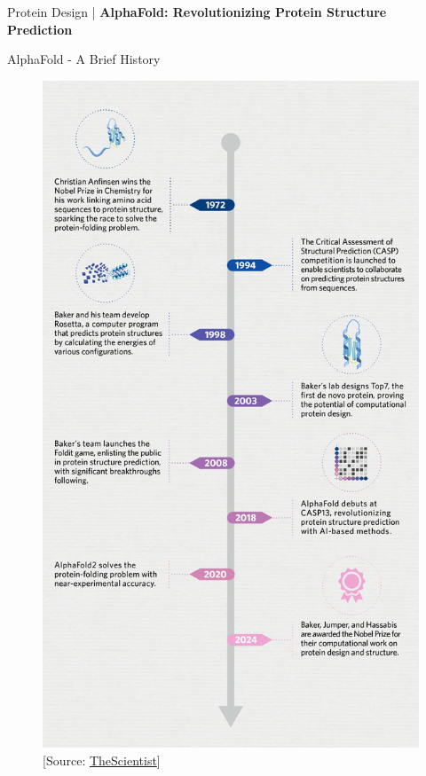 \begin{frame}{}
    \LARGE Protein Design | \textbf{AlphaFold: Revolutionizing Protein Structure Prediction}
\end{frame}

\begin{frame}[allowframebreaks]{AlphaFold - A Brief History}
    \begin{figure}
        \centering
        \includegraphics[angle=90,height=0.8\textheight,width=1\textwidth,keepaspectratio]{images/science/timeline.png}
        [Source: \href{https://www.the-scientist.com/the-journey-to-a-nobel-prize-a-protein-design-and-structure-research-timeline-72256}{TheScientist}]
    \end{figure}


\end{frame}
